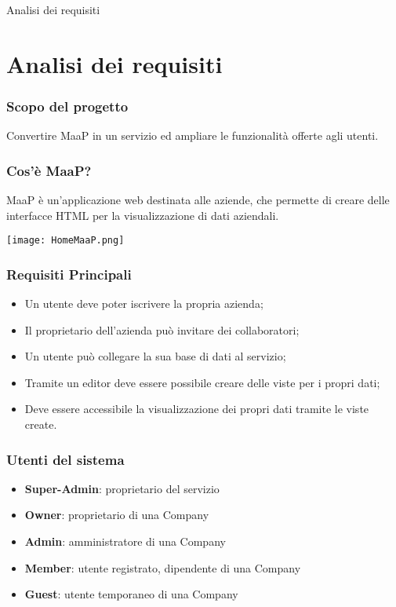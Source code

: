 \begin{frame}

\begin{center}
    \huge Analisi dei requisiti
\end{center}

\end{frame}

\section{Analisi dei requisiti}
\begin{frame}
  \frametitle{Scopo del progetto}

  \begin{center}
    Convertire MaaP in un servizio ed ampliare le funzionalità offerte agli utenti.
  \end{center}
\end{frame}

\begin{frame}
  \frametitle{Cos'è MaaP?}

  MaaP è un'applicazione web destinata alle aziende, che permette di creare delle interfacce HTML per la visualizzazione di dati aziendali.

   \texttt{[image: HomeMaaP.png]}
  
\end{frame}

\begin{frame}
  \frametitle{Requisiti Principali}

  \begin{itemize}
  \item Un utente deve poter iscrivere la propria azienda;
  \item Il proprietario dell'azienda può invitare dei collaboratori;
  \item Un utente può collegare la sua base di dati al servizio;
  \item Tramite un editor deve essere possibile creare delle viste per i propri dati;
  \item Deve essere accessibile la visualizzazione dei propri dati tramite le viste create.
  \end{itemize}
\end{frame}


\begin{frame}
  \frametitle{Utenti del sistema}

  \begin{itemize}
  \item \textbf{Super-Admin}: proprietario del servizio
  \item \textbf{Owner}: proprietario di una Company
  \item \textbf{Admin}: amministratore di una Company
  \item \textbf{Member}: utente registrato, dipendente di una Company
  \item \textbf{Guest}: utente temporaneo di una Company
  \end{itemize}

\end{frame}

